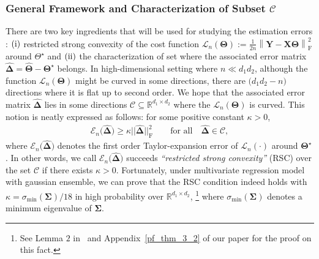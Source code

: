 \documentclass[alpha-refs]{wiley-article}
\newcommand{\RN}[1]{ \textup{\uppercase\expandafter{\romannumeral#1}} }
\begin{document}
\subsubsection{General Framework and Characterization of Subset $\mathcal{C}$} \label{GF}
There are two key ingredients that will be used for studying the estimation errors : $(\RN{1})$ restricted strong convexity of the cost function $\mathcal{L}_{n}(\boldsymbol{\Theta}):= \frac{1}{2n} \left\| \boldsymbol{Y}-\boldsymbol{X}\boldsymbol{\Theta} \right\|_{\text{F}}^{2}$ around $\Theta^\star$ and
$(\RN{2})$ the characterization of set where the associated error matrix $\boldsymbol{\widehat{\Delta}}=\widehat{\boldsymbol{\Theta}}-\boldsymbol{\Theta^{\star}}$ belongs.
In high-dimensional setting where $n \ll d_{1}d_{2}$, although the function $\mathcal{L}_{n}(\boldsymbol{\Theta})$ might be curved in some directions, there are $\big(d_{1}d_{2}-n\big)$ directions where it is flat up to second order.
We hope that the associated error matrix $\boldsymbol{\widehat{\Delta}}$
lies in some directions $\mathcal{C}\subseteq \mathbb{R}^{d_{1}\times d_{2}}$ where the $\mathcal{L}_{n}(\boldsymbol{\Theta})$ is curved.
This notion is neatly expressed as follows: for some positive constant $\kappa>0$,
\begin{align} \label{RSC}
    \mathcal{E}_{n}\big(\boldsymbol{\widehat{\Delta}})\geq \kappa || \boldsymbol{\widehat{\Delta}} ||_{\text{F}}^{2} \qquad \text{for all} \quad \boldsymbol{\widehat{\Delta}}\in\mathcal{C},
\end{align}
where $\mathcal{E}_{n}\big(\boldsymbol{\widehat{\Delta}})$ denotes the first order Taylor-expansion error of $\mathcal{L}_{n}(\cdot)$ around $\boldsymbol{\Theta}^\star$.
In other words, we call $\mathcal{E}_{n}\big(\boldsymbol{\widehat{\Delta}})$ succeeds \textit{``restricted strong convexity''} (RSC) over the set $\mathcal{C}$ if there exists $\kappa>0$.
Fortunately, under multivariate regression model with gaussian ensemble, we can prove that the RSC condition indeed holds with $\kappa=\sigma_{\text{min}}(\boldsymbol{\Sigma})/18$ in high probability over $\mathbb{R}^{d_{1} \times d_{2}}$,
\footnote{See Lemma $2$ in~\citet{negahban2011estimation} and Appendix~\ref{pf_thm_3_2} of our paper for the proof on this fact.} where $\sigma_{\text{min}}(\boldsymbol{\Sigma})$ denotes a minimum eigenvalue of $\boldsymbol{\Sigma}$.
\end{document}
